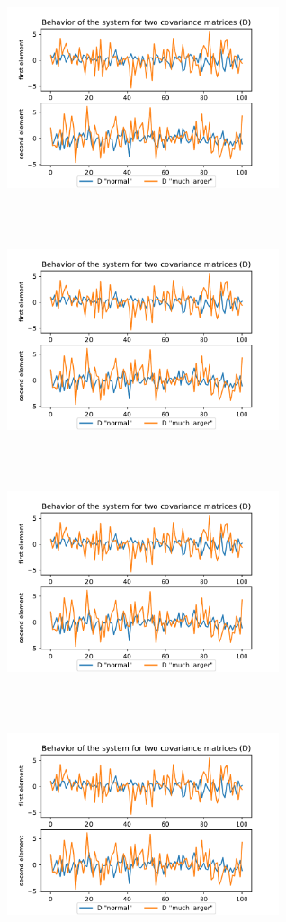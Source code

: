 \documentclass[11pt, english]{article}
\begin{document}
\begin{center}
	\begin{figure}[ht!]
		\centering
		\includegraphics[height=7cm,width=8cm, page=1]{figures}
		\includegraphics[height=7cm,width=8cm, page=2]{figures}
		\includegraphics[height=7cm,width=8cm, page=3]{figures}
		\includegraphics[height=7cm,width=8cm, page=4]{figures}
	\end{figure}
\end{center}
\end{document}
